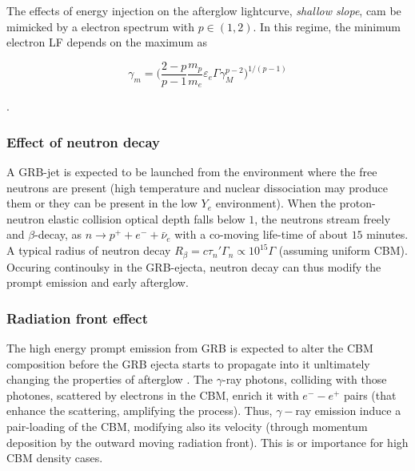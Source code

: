 The effects of energy injection on the afterglow lightcurve, \textit{shallow slope}, cam be mimicked by a electron spectrum with $p\in(1,2)$. In this regime, the minimum electron LF depends on the maximum as 

\begin{equation}
\gamma_m = \Bigg( \frac{2-p}{p-1} \frac{m_p}{m_e} \varepsilon_e \Gamma \gamma_M^{p-2} \Bigg)^{1/(p-1)}
\end{equation}

\cite{cf. (Dai and Cheng, 2001; Bhattacharya, 2001; Resmi and Bhattacharya, 2008}.


\subsubsection{Effect of neutron decay}

A GRB-jet is expected to be launched from the environment where the free neutrons are present (high temperature and nuclear dissociation may produce them or they can be present in the low $Y_e$ environment). When the proton-neutron elastic collision optical depth falls below $1$, the neutrons stream freely
\cite{(Derishev et al., 1999; Bahcall and Meszaros, 2000; Meszaros and Rees, 2000a; Beloborodov, 2003b)} and $\beta$-decay, as $n\rightarrow p^+ + e^- + \bar{\nu}_e$ with a co-moving life-time of about $15$ minutes. A typical radius of neutron decay $R_{\beta} = c\tau_n'\Gamma_n\propto 10^{15}\Gamma$ (assuming uniform CBM). Occuring continoulsy in the GRB-ejecta, neutron decay can thus modify the prompt emission and early afterglow.


\subsubsection{Radiation front effect}

The high energy prompt emission from GRB is expected to alter the CBM composition before the GRB ejecta starts to propagate into it unltimately changing the properties of afterglow \cite{Madau and Thompson, 2000; Thompson and Madau, 2000; Meszaros et al., 2001; Beloborodov, 2002; Kumar and Panaitescu, 2004}.
The $\gamma$-ray photons, colliding with those photones, scattered by electrons in the CBM, enrich it with $e^--e^+$ pairs (that enhance the scattering, amplifying the process). Thus, $\gamma-$ray emission induce a pair-loading of the CBM, modifying also its velocity (through momentum deposition by the outward moving radiation front). This is or  importance for high CBM density cases.

